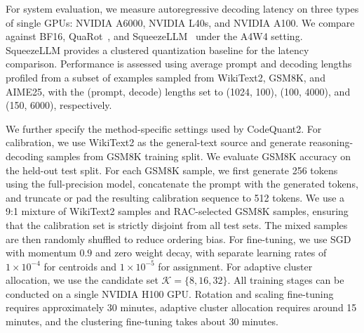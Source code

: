 \documentclass{article}
\begin{document}
For system evaluation, we measure autoregressive decoding latency on three types of single GPUs: NVIDIA A6000, NVIDIA L40s, and NVIDIA A100. We compare against BF16, QuaRot~\citep{ashkboos2024quarotoutlierfree4bitinference}, and SqueezeLLM~\citep{kim2024squeezellmdenseandsparsequantization} under the A4W4 setting. SqueezeLLM provides a clustered quantization baseline for the latency comparison. Performance is assessed using average prompt and decoding lengths profiled from a subset of examples sampled from WikiText2, GSM8K, and AIME25, with the (prompt, decode) lengths set to (1024, 100), (100, 4000), and (150, 6000), respectively. 

We further specify the method-specific settings used by CodeQuant2. For calibration, we use WikiText2 as the general-text source and generate reasoning-decoding samples from GSM8K training split. We evaluate GSM8K accuracy on the held-out test split. For each GSM8K sample, we first generate 256 tokens using the full-precision model, concatenate the prompt with the generated tokens, and truncate or pad the resulting calibration sequence to 512 tokens. We use a 9:1 mixture of WikiText2 samples and RAC-selected GSM8K samples, ensuring that the calibration set is strictly disjoint from all test sets. The mixed samples are then randomly shuffled to reduce ordering bias. For fine-tuning, we use SGD with momentum $0.9$ and zero weight decay, with separate learning rates of $1\times10^{-4}$ for centroids and $1\times10^{-5}$ for assignment. For adaptive cluster allocation, we use the candidate set $\mathcal{K}=\{8,16,32\}$. All training stages can be conducted on a single NVIDIA H100 GPU. Rotation and scaling fine-tuning requires approximately 30 minutes, adaptive cluster allocation requires around 15 minutes, and the clustering fine-tuning takes about 30 minutes.
\end{document}

